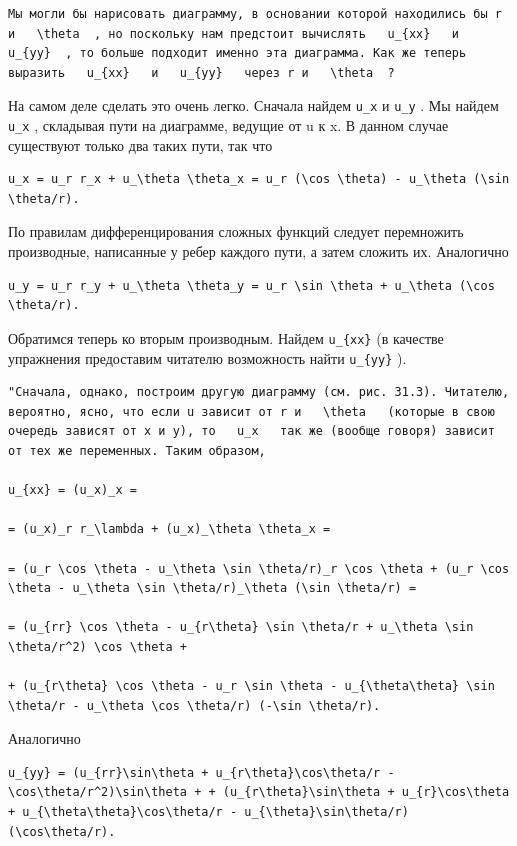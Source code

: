 \documentclass[
  ukrainian,
]{article}
\begin{document}
\begin{verbatim}
Мы могли бы нарисовать диаграмму, в основании которой находились бы r и   \theta  , но поскольку нам предстоит вычислять   u_{xx}   и   u_{yy}  , то больше подходит именно эта диаграмма. Как же теперь выразить   u_{xx}   и   u_{yy}   через r и   \theta  ?
\end{verbatim}

На самом деле сделать это очень легко. Сначала найдем \texttt{u\_x} и
\texttt{u\_y} . Мы найдем \texttt{u\_x} , складывая пути на диаграмме,
ведущие от u к x. В данном случае существуют только два таких пути, так
что

\begin{verbatim}
u_x = u_r r_x + u_\theta \theta_x = u_r (\cos \theta) - u_\theta (\sin \theta/r).
\end{verbatim}

По правилам дифференцирования сложных функций следует перемножить
производные, написанные у ребер каждого пути, а затем сложить их.
Аналогично

\begin{verbatim}
u_y = u_r r_y + u_\theta \theta_y = u_r \sin \theta + u_\theta (\cos \theta/r).
\end{verbatim}

Обратимся теперь ко вторым производным. Найдем \texttt{u\_\{xx\}} (в
качестве упражнения предоставим читателю возможность найти
\texttt{u\_\{yy\}} ).

\begin{verbatim}
"Сначала, однако, построим другую диаграмму (см. рис. 31.3). Читателю, вероятно, ясно, что если u зависит от r и   \theta   (которые в свою очередь зависят от x и y), то   u_x   так же (вообще говоря) зависит от тех же переменных. Таким образом,

u_{xx} = (u_x)_x =

= (u_x)_r r_\lambda + (u_x)_\theta \theta_x =

= (u_r \cos \theta - u_\theta \sin \theta/r)_r \cos \theta + (u_r \cos \theta - u_\theta \sin \theta/r)_\theta (\sin \theta/r) =

= (u_{rr} \cos \theta - u_{r\theta} \sin \theta/r + u_\theta \sin \theta/r^2) \cos \theta +

+ (u_{r\theta} \cos \theta - u_r \sin \theta - u_{\theta\theta} \sin \theta/r - u_\theta \cos \theta/r) (-\sin \theta/r).
\end{verbatim}

Аналогично

\begin{verbatim}
u_{yy} = (u_{rr}\sin\theta + u_{r\theta}\cos\theta/r - \cos\theta/r^2)\sin\theta + + (u_{r\theta}\sin\theta + u_{r}\cos\theta + u_{\theta\theta}\cos\theta/r - u_{\theta}\sin\theta/r)(\cos\theta/r).
\end{verbatim}
\end{document}
